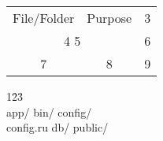 \documentclass[11pt]{report}
\begin{document}
	\begin{tabular}{||c|c|c||}
		\hline File/Folder & Purpose & 3\\ \cline{1-2}

		\multicolumn{2}{|c|}{4  5} & 6\\
		\hline
		7 & 8 & 9\\
		\hline
	\end{tabular}
	
	\begin{tabbing}
		1\qquad\qquad\= 2\qquad\qquad\= 3\\
		app/ \>bin/ \>config/\\
		config.ru \>db/ \>public/
	\end{tabbing}
\end{document}
